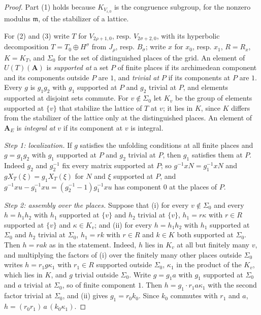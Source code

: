 \begin{proof}
Part (1) holds because $K_{V_{i,0}}$ is the congruence subgroup, for the nonzero
modulus $\mathfrak m$, of the stabilizer of a lattice.

For (2) and (3) write $T$ for $V_{2\rho+1,0}$, resp. $V_{2\sigma+2,0}$, with its
hyperbolic decomposition $T=T_0\oplus H^\sigma$ from $J_\rho$, resp. $B_\sigma$;
write $x$ for $x_0$, resp. $x_1$, $R=R_x$, $K=K_T$, and $\Sigma_0$ for the set of
distinguished places of the grid. An element of $U(T)(\mathbf A)$ is
\emph{supported at} a set $P$ of finite places if its archimedean component and
its components outside $P$ are $1$, and \emph{trivial at} $P$ if its components
at $P$ are $1$. Every $g$ is $g_1g_2$ with $g_1$ supported at $P$ and $g_2$
trivial at $P$, and elements supported at disjoint sets commute. For
$v\notin\Sigma_0$ let $K_v$ be the group of elements supported at $\{v\}$ that
stabilize the lattice of $T$ at $v$; it lies in $K$, since $K$ differs from the
stabilizer of the lattice only at the distinguished places. An element of
$\mathbf A_E$ is \emph{integral at} $v$ if its component at $v$ is integral.

\emph{Step 1: localization.} If $g$ satisfies the unfolding conditions at all
finite places and $g=g_1g_2$ with $g_1$ supported at $P$ and $g_2$ trivial at
$P$, then $g_1$ satisfies them at $P$. Indeed $g_2$ and $g_2^{-1}$ fix every
matrix supported at $P$; so $g^{-1}xN=g_1^{-1}xN$ and $gX_T(\xi)=g_1X_T(\xi)$ for
$N$ and $\xi$ supported at $P$, and $g^{-1}xu-g_1^{-1}xu=(g_2^{-1}-1)g_1^{-1}xu$
has component $0$ at the places of $P$.

\emph{Step 2: assembly over the places.} Suppose that (i) for every
$v\notin\Sigma_0$ and every $h=h_1h_2$ with $h_1$ supported at $\{v\}$ and $h_2$
trivial at $\{v\}$, $h_1=r\kappa$ with $r\in R$ supported at $\{v\}$ and
$\kappa\in K_v$; and (ii) for every $h=h_1h_2$ with $h_1$ supported at
$\Sigma_0$ and $h_2$ trivial at $\Sigma_0$, $h_1=rk$ with $r\in R$ and $k\in K$
both supported at $\Sigma_0$. Then $h=rak$ as in the statement. Indeed, $h$ lies
in $K_v$ at all but finitely many $v$, and multiplying the factors of (i) over
the finitely many other places outside $\Sigma_0$ writes $h=r_1g\kappa_1$ with
$r_1\in R$ supported outside $\Sigma_0$, $\kappa_1$ in the product of the $K_v$,
which lies in $K$, and $g$ trivial outside $\Sigma_0$. Write $g=g_1a$ with $g_1$
supported at $\Sigma_0$ and $a$ trivial at $\Sigma_0$, so of finite component
$1$. Then $h=g_1\cdot r_1a\kappa_1$ with the second factor trivial at
$\Sigma_0$, and (ii) gives $g_1=r_0k_0$. Since $k_0$ commutes with $r_1$ and $a$,
$h=(r_0r_1)\,a\,(k_0\kappa_1)$.


\end{proof}
